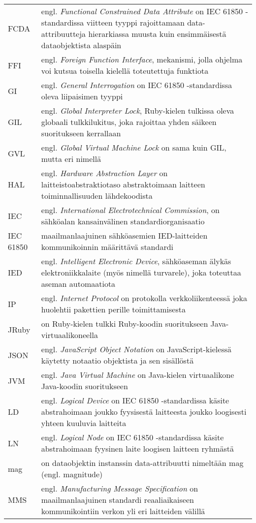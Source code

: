 \begin{tabularx}{\linewidth}[h]{@{} p{} p{} @{}}
	FCDA & engl. \emph{Functional Constrained Data Attribute} on IEC 61850 -standardissa viitteen tyyppi rajoittamaan data-attribuutteja hierarkiassa muusta kuin ensimmäisestä dataobjektista alaspäin \\
	FFI & engl. \emph{Foreign Function Interface}, mekanismi, jolla ohjelma voi kutsua toisella kielellä toteutettuja funktiota \\
	GI & engl. \emph{General Interrogation} on IEC 61850 -standardissa oleva liipaisimen tyyppi \\
	GIL & engl. \emph{Global Interpreter Lock}, Ruby-kielen tulkissa oleva globaali tulkkilukitus, joka rajoittaa yhden säikeen suoritukseen kerrallaan \\
	GVL & engl. \emph{Global Virtual Machine Lock} on sama kuin GIL, mutta eri nimellä \\
	HAL & engl. \emph{Hardware Abstraction Layer} on laitteistoabstraktiotaso abstraktoimaan laitteen toiminnallisuuden lähdekoodista \\
	IEC & engl. \emph{International Electrotechnical Commission}, on sähköalan kansainvälinen standardiorganisaatio \\
	IEC 61850 & maailmanlaajuinen sähköasemien IED-laitteiden kommunikoinnin määrittävä standardi \\
	IED & engl. \emph{Intelligent Electronic Device}, sähköaseman älykäs elektroniikkalaite (myös nimellä turvarele), joka toteuttaa aseman automaatiota \\
	IP & engl. \emph{Internet Protocol} on protokolla verkkoliikenteessä joka huolehtii pakettien perille toimittamisesta \\
	JRuby & on Ruby-kielen tulkki Ruby-koodin suoritukseen Java-virtuaalikoneella \\
	JSON & engl. \emph{JavaScript Object Notation} on JavaScript-kielessä käytetty notaatio objektista ja sen sisällöstä \\
	JVM & engl. \emph{Java Virtual Machine} on Java-kielen virtuaalikone Java-koodin suoritukseen \\
	LD & engl. \emph{Logical Device} on IEC 61850 -standardissa käsite abstrahoimaan joukko fyysisestä laitteesta joukko loogisesti yhteen kuuluvia laitteita \\
	LN & engl. \emph{Logical Node} on IEC 61850 -standardissa käsite abstrahoimaan fyysinen laite loogisen laitteen ryhmästä \\
	mag & on dataobjektin instanssin data-attribuutti nimeltään mag (engl. magnitude) \\
	MMS & engl. \emph{Manufacturing Message Specification} on maailmanlaajuinen standardi reaaliaikaiseen kommunikointiin verkon yli eri laitteiden välillä \\

\end{tabularx}
